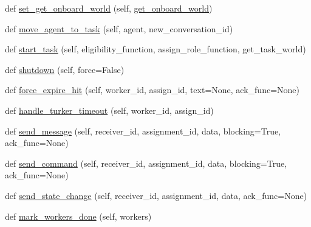 \begin{DoxyCompactItemize}
def \hyperlink{classparlai_1_1mturk_1_1core_1_1dev_1_1mturk__manager_1_1MTurkManager_a004652cf2f04d80b22f793989805b4a5}{set\+\_\+get\+\_\+onboard\+\_\+world} (self, \hyperlink{classparlai_1_1mturk_1_1core_1_1dev_1_1mturk__manager_1_1MTurkManager_a240c3356fab6619320eee2f5c2cac04b}{get\+\_\+onboard\+\_\+world})
\item 
def \hyperlink{classparlai_1_1mturk_1_1core_1_1dev_1_1mturk__manager_1_1MTurkManager_a5d94348203b9b4966f99e322dcba34ba}{move\+\_\+agent\+\_\+to\+\_\+task} (self, agent, new\+\_\+conversation\+\_\+id)
\item 
def \hyperlink{classparlai_1_1mturk_1_1core_1_1dev_1_1mturk__manager_1_1MTurkManager_a3e7d8f931122df4baca89ef8f189680f}{start\+\_\+task} (self, eligibility\+\_\+function, assign\+\_\+role\+\_\+function, get\+\_\+task\+\_\+world)
\item 
def \hyperlink{classparlai_1_1mturk_1_1core_1_1dev_1_1mturk__manager_1_1MTurkManager_aed24109ea692ec84127727a7e4df0a5a}{shutdown} (self, force=False)
\item 
def \hyperlink{classparlai_1_1mturk_1_1core_1_1dev_1_1mturk__manager_1_1MTurkManager_a95b15080d7a14ee2207fa0643530ce95}{force\+\_\+expire\+\_\+hit} (self, worker\+\_\+id, assign\+\_\+id, text=None, ack\+\_\+func=None)
\item 
def \hyperlink{classparlai_1_1mturk_1_1core_1_1dev_1_1mturk__manager_1_1MTurkManager_af1b8603bddc64a3e317f7f9a5d748e2c}{handle\+\_\+turker\+\_\+timeout} (self, worker\+\_\+id, assign\+\_\+id)
\item 
def \hyperlink{classparlai_1_1mturk_1_1core_1_1dev_1_1mturk__manager_1_1MTurkManager_a8462af5dea67437813f6eb44d67e2306}{send\+\_\+message} (self, receiver\+\_\+id, assignment\+\_\+id, data, blocking=True, ack\+\_\+func=None)
\item 
def \hyperlink{classparlai_1_1mturk_1_1core_1_1dev_1_1mturk__manager_1_1MTurkManager_a4156d93d892d08db4b1fe1a27e5f9f3c}{send\+\_\+command} (self, receiver\+\_\+id, assignment\+\_\+id, data, blocking=True, ack\+\_\+func=None)
\item 
def \hyperlink{classparlai_1_1mturk_1_1core_1_1dev_1_1mturk__manager_1_1MTurkManager_ad1ff8e2af7fe866ed623d640f4605090}{send\+\_\+state\+\_\+change} (self, receiver\+\_\+id, assignment\+\_\+id, data, ack\+\_\+func=None)
\item 
def \hyperlink{classparlai_1_1mturk_1_1core_1_1dev_1_1mturk__manager_1_1MTurkManager_aeb9072df3104a5a3fbf3a5ecda89b41f}{mark\+\_\+workers\+\_\+done} (self, workers)
\item 

\end{DoxyCompactItemize}
